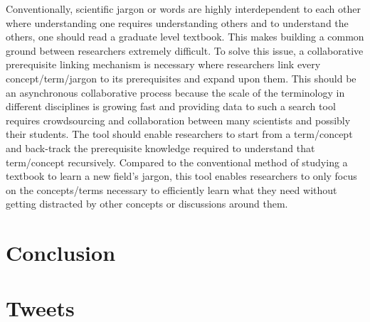 \documentclass[acmsmall,authordraft]{acmart}
\begin{document}
Conventionally, scientific jargon or words are highly interdependent to each other where understanding one requires understanding others and to understand the others, one should read a graduate level textbook. This makes building a common ground between researchers extremely difficult. To solve this issue, a collaborative prerequisite linking mechanism is necessary where researchers link every concept/term/jargon to its prerequisites and expand upon them. This should be an asynchronous collaborative process because the scale of the terminology in different disciplines is growing fast and providing data to such a search tool requires crowdsourcing and collaboration between many scientists and possibly their students. The tool should enable researchers to start from a term/concept and back-track the prerequisite knowledge required to understand that term/concept recursively. Compared to the conventional method of studying a textbook to learn a new field’s jargon, this tool enables researchers to only focus on the concepts/terms necessary to efficiently learn what they need without getting distracted by other concepts or discussions around them.


\section{Conclusion}
\label{Conclusion}



































\appendix
\section{Tweets}
\end{document}

